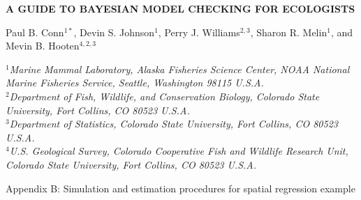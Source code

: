 \documentclass[12pt,fleqn]{article}
\begin{document}
\begin{center} \bf {\large A GUIDE TO BAYESIAN MODEL CHECKING FOR ECOLOGISTS}

\vspace{0.7cm}
Paul B. Conn$^{1*}$, Devin S. Johnson$^1$, Perry J. Williams$^{2,3}$, Sharon R. Melin$^1$, and Mevin
    B. Hooten$^{4,2,3}$
\end{center}
\vspace{0.5cm}

\rm
\small

\it $^1$Marine Mammal Laboratory, Alaska Fisheries Science Center,
NOAA National Marine Fisheries Service,
Seattle, Washington 98115 U.S.A.\\

\it $^2$Department of Fish, Wildlife, and Conservation Biology, Colorado State University, Fort Collins, CO 80523 U.S.A.\\

\it $^3$Department of Statistics, Colorado State University, Fort Collins, CO 80523 U.S.A.\\

\it $^4$U.S. Geological Survey, Colorado Cooperative Fish and Wildlife Research Unit, Colorado State University, Fort Collins, CO 80523 U.S.A.\\

\raggedbottom
\vspace{.5in}

\rm
Appendix B: Simulation and estimation procedures for spatial regression example
\bigskip

\vspace{.3in}

\doublespacing
\end{document}
